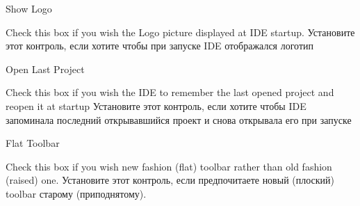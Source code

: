 \begin{popup}
\caption{Show Logo}

\ifenglish
Check this box if you wish the Logo picture displayed at IDE startup.
\else
Установите этот контроль, если хотите чтобы при запуске IDE отображался 
логотип
\fi
\end{popup}

\begin{popup}
\caption{Open Last Project}

\ifenglish
Check this box if you wish the IDE to remember the last opened project
and reopen it at startup
\else
Установите этот контроль, если хотите чтобы IDE запоминала последний 
открывавшийся проект и снова открывала его при запуске 
\fi
\end{popup}

\begin{popup}
\caption{Flat Toolbar}

\ifenglish
Check this box if you wish new fashion (flat) toolbar rather than old fashion
(raised) one.
\else
Установите этот контроль, если предпочитаете новый (плоский) toolbar старому
(приподнятому).
\fi
\end{popup}
